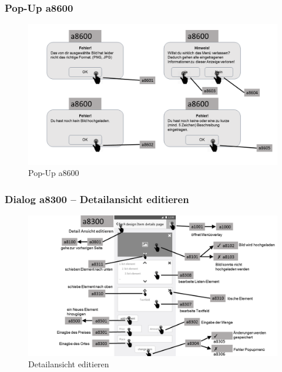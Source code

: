 \documentclass[a4paper,12pt,oneside]{scrartcl}
\begin{document}
\subsubsection{Pop-Up a8600}
\begin{figure}[!htbp]
\centering
\noindent\includegraphics[width=\linewidth,height=\textheight,keepaspectratio]{Dialoge/a8100p}
\caption{Pop-Up a8600}
\end{figure}
\FloatBarrier

\subsubsection{Dialog a8300 – Detailansicht editieren}
\begin{figure}[!htbp]
\centering
\noindent\includegraphics[width=\linewidth,height=\textheight,keepaspectratio]{Dialoge/a8300}
\caption{Detailansicht editieren}
\end{figure}
\FloatBarrier
\end{document}
